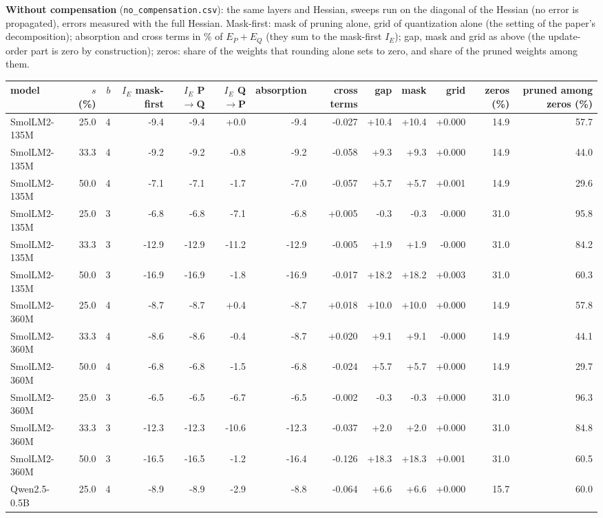 \documentclass{article}
\begin{document}
\textbf{Without compensation} (\texttt{no\_compensation.csv}): the same layers and Hessian, sweeps run on the diagonal of the Hessian (no error is propagated), errors measured with the full Hessian. Mask-first: mask of pruning alone, grid of quantization alone (the setting of the paper's decomposition); absorption and cross terms in \% of $E_P+E_Q$ (they sum to the mask-first $I_E$); gap, mask and grid as above (the update-order part is zero by construction); zeros: share of the weights that rounding alone sets to zero, and share of the pruned weights among them.
\begin{longtable}{lrrrrrrrrrrrr}
\toprule model & $s$ (\%) & $b$ & $I_E$ mask-first & $I_E$ P$\to$Q & $I_E$ Q$\to$P & absorption & cross terms & gap & mask & grid & zeros (\%) & pruned among zeros (\%) \\ \midrule \endhead
SmolLM2-135M & 25.0 & 4 & -9.4 & -9.4 & +0.0 & -9.4 & -0.027 & +10.4 & +10.4 & +0.000 & 14.9 & 57.7 \\
SmolLM2-135M & 33.3 & 4 & -9.2 & -9.2 & -0.8 & -9.2 & -0.058 & +9.3 & +9.3 & +0.000 & 14.9 & 44.0 \\
SmolLM2-135M & 50.0 & 4 & -7.1 & -7.1 & -1.7 & -7.0 & -0.057 & +5.7 & +5.7 & +0.001 & 14.9 & 29.6 \\
SmolLM2-135M & 25.0 & 3 & -6.8 & -6.8 & -7.1 & -6.8 & +0.005 & -0.3 & -0.3 & -0.000 & 31.0 & 95.8 \\
SmolLM2-135M & 33.3 & 3 & -12.9 & -12.9 & -11.2 & -12.9 & -0.005 & +1.9 & +1.9 & -0.000 & 31.0 & 84.2 \\
SmolLM2-135M & 50.0 & 3 & -16.9 & -16.9 & -1.8 & -16.9 & -0.017 & +18.2 & +18.2 & +0.003 & 31.0 & 60.3 \\
SmolLM2-360M & 25.0 & 4 & -8.7 & -8.7 & +0.4 & -8.7 & +0.018 & +10.0 & +10.0 & +0.000 & 14.9 & 57.8 \\
SmolLM2-360M & 33.3 & 4 & -8.6 & -8.6 & -0.4 & -8.7 & +0.020 & +9.1 & +9.1 & -0.000 & 14.9 & 44.1 \\
SmolLM2-360M & 50.0 & 4 & -6.8 & -6.8 & -1.5 & -6.8 & -0.024 & +5.7 & +5.7 & +0.000 & 14.9 & 29.7 \\
SmolLM2-360M & 25.0 & 3 & -6.5 & -6.5 & -6.7 & -6.5 & -0.002 & -0.3 & -0.3 & +0.000 & 31.0 & 96.3 \\
SmolLM2-360M & 33.3 & 3 & -12.3 & -12.3 & -10.6 & -12.3 & -0.037 & +2.0 & +2.0 & +0.000 & 31.0 & 84.8 \\
SmolLM2-360M & 50.0 & 3 & -16.5 & -16.5 & -1.2 & -16.4 & -0.126 & +18.3 & +18.3 & +0.001 & 31.0 & 60.5 \\
Qwen2.5-0.5B & 25.0 & 4 & -8.9 & -8.9 & -2.9 & -8.8 & -0.064 & +6.6 & +6.6 & +0.000 & 15.7 & 60.0 \\

\end{longtable}
\end{document}
